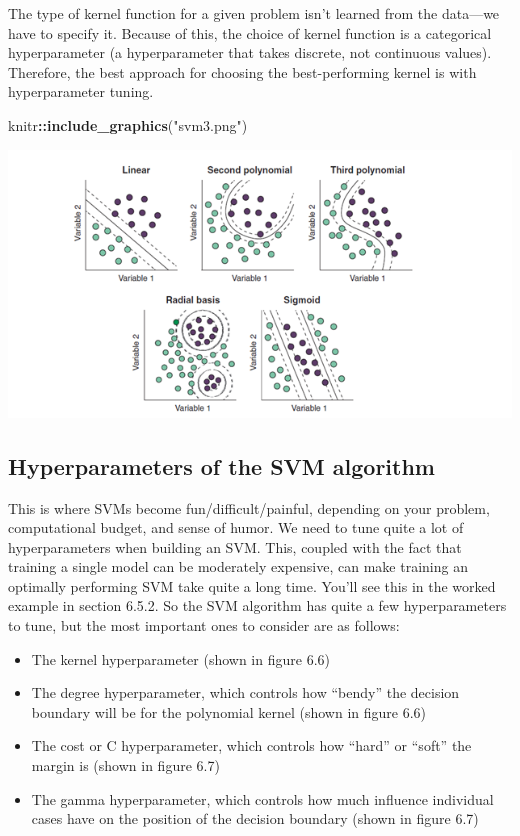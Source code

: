 \documentclass[
]{article}
\newenvironment{Shaded}{\begin{snugshade}}{\end{snugshade}}
\newcommand{\FunctionTok}[1]{\textcolor[rgb]{0.13,0.29,0.53}{\textbf{#1}}}
\newcommand{\NormalTok}[1]{#1}
\newcommand{\SpecialCharTok}[1]{\textcolor[rgb]{0.81,0.36,0.00}{\textbf{#1}}}
\newcommand{\StringTok}[1]{\textcolor[rgb]{0.31,0.60,0.02}{#1}}
\providecommand{\tightlist}{%
  \setlength{\itemsep}{0pt}\setlength{\parskip}{0pt}}
\begin{document}
The type of kernel function for a given problem isn't learned from the
data---we have to specify it. Because of this, the choice of kernel
function is a categorical hyperparameter (a hyperparameter that takes
discrete, not continuous values). Therefore, the best approach for
choosing the best-performing kernel is with hyperparameter tuning.

\begin{Shaded}
\begin{Highlighting}[]
\NormalTok{knitr}\SpecialCharTok{::}\FunctionTok{include\_graphics}\NormalTok{(}\StringTok{"svm3.png"}\NormalTok{)}
\end{Highlighting}
\end{Shaded}

\includegraphics[width=8.67in]{svm3}

\subsection{Hyperparameters of the SVM
algorithm}\label{hyperparameters-of-the-svm-algorithm}

This is where SVMs become fun/difficult/painful, depending on your
problem, computational budget, and sense of humor. We need to tune quite
a lot of hyperparameters when building an SVM. This, coupled with the
fact that training a single model can be moderately expensive, can make
training an optimally performing SVM take quite a long time. You'll see
this in the worked example in section 6.5.2. So the SVM algorithm has
quite a few hyperparameters to tune, but the most important ones to
consider are as follows:

\begin{itemize}
\tightlist
\item
  The kernel hyperparameter (shown in figure 6.6)
\item
  The degree hyperparameter, which controls how ``bendy'' the decision
  boundary will be for the polynomial kernel (shown in figure 6.6)
\item
  The cost or C hyperparameter, which controls how ``hard'' or ``soft''
  the margin is (shown in figure 6.7)
\item
  The gamma hyperparameter, which controls how much influence individual
  cases have on the position of the decision boundary (shown in figure
  6.7)
\end{itemize}
\end{document}
